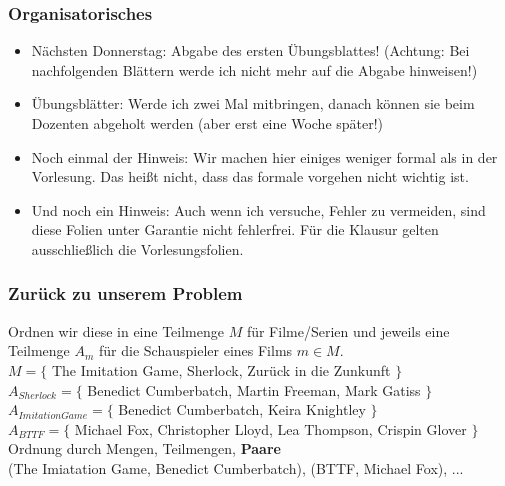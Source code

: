 
\newcommand{\mydate}{04.11.2016}

\newcommand{\handout}{}



\graphicspath{{../figures/}}



\begin{frame}
	\frametitle{Organisatorisches}
	
	\begin{itemize}
		\item Nächsten Donnerstag: Abgabe des ersten Übungsblattes! (Achtung: Bei nachfolgenden Blättern werde ich nicht mehr auf die Abgabe hinweisen!)
		\item Übungsblätter: Werde ich zwei Mal mitbringen, danach können sie beim Dozenten abgeholt werden (aber erst eine Woche später!)
		\item Noch einmal der Hinweis: Wir machen hier einiges weniger formal als in der Vorlesung. Das heißt nicht, dass das formale vorgehen nicht wichtig ist.
		\item Und noch ein Hinweis: Auch wenn ich versuche, Fehler zu vermeiden, sind diese Folien unter Garantie nicht fehlerfrei. Für die Klausur gelten ausschließlich die Vorlesungsfolien.
	\end{itemize}
\end{frame}

\framePrevEpisode

\begin{frame}
	\frametitle{Zurück zu unserem Problem}
	Ordnen wir diese in eine Teilmenge $M$ für Filme/Serien und jeweils eine Teilmenge $A_m$ für die Schauspieler eines Films $m \in M$. \\[0.5em]
	$M = \{$ The Imitation Game, Sherlock, Zurück in die Zunkunft $\}$ \\[0.3em]
	$A_{Sherlock} = \{$ Benedict Cumberbatch, Martin Freeman, Mark Gatiss $\}$ \\
	$A_{Imitation Game} = \{$ Benedict Cumberbatch, Keira Knightley $\}$ \\
	$A_{BTTF} = \{$ Michael Fox, Christopher Lloyd, Lea Thompson, Crispin Glover $\}$ \\[2em]
	
	Ordnung durch Mengen, Teilmengen, \textbf{Paare}\\ \pause
	(The Imiatation Game, Benedict Cumberbatch), (BTTF, Michael Fox), ...
	
\end{frame}

